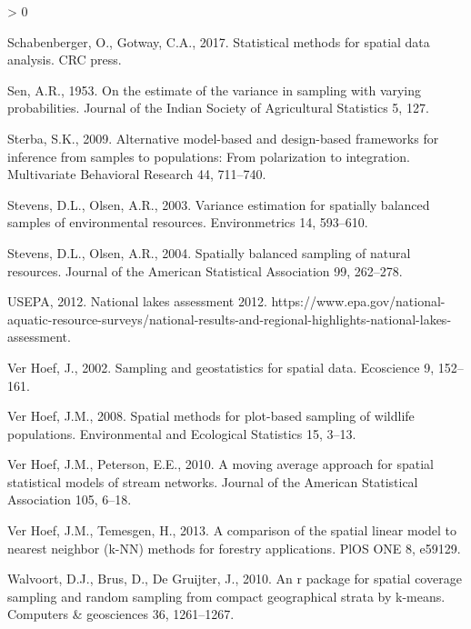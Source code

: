 \documentclass[]{elsarticle} %
\newlength{\cslhangindent}
\newenvironment{CSLReferences}[2] %
 {%
  \setlength{\parindent}{0pt}
  \ifodd #1 \everypar{\setlength{\hangindent}{\cslhangindent}}\ignorespaces\fi
  \ifnum #2 > 0
  \setlength{\parskip}{#2\baselineskip}
  \fi
 }%
 {}
\begin{document}
\begin{CSLReferences}{1}{0}
\leavevmode\hypertarget{ref-schabenberger2017statistical}{}%
Schabenberger, O., Gotway, C.A., 2017. Statistical methods for spatial
data analysis. CRC press.

\leavevmode\hypertarget{ref-sen1953estimate}{}%
Sen, A.R., 1953. On the estimate of the variance in sampling with
varying probabilities. Journal of the Indian Society of Agricultural
Statistics 5, 127.

\leavevmode\hypertarget{ref-sterba2009alternative}{}%
Sterba, S.K., 2009. Alternative model-based and design-based frameworks
for inference from samples to populations: From polarization to
integration. Multivariate Behavioral Research 44, 711--740.

\leavevmode\hypertarget{ref-stevens2003variance}{}%
Stevens, D.L., Olsen, A.R., 2003. Variance estimation for spatially
balanced samples of environmental resources. Environmetrics 14,
593--610.

\leavevmode\hypertarget{ref-stevens2004spatially}{}%
Stevens, D.L., Olsen, A.R., 2004. Spatially balanced sampling of natural
resources. Journal of the American Statistical Association 99, 262--278.

\leavevmode\hypertarget{ref-USEPA2012NLA}{}%
USEPA, 2012. National lakes assessment 2012.
https://www.epa.gov/national-aquatic-resource-surveys/national-results-and-regional-highlights-national-lakes-assessment.

\leavevmode\hypertarget{ref-verhoef2002sampling}{}%
Ver Hoef, J., 2002. Sampling and geostatistics for spatial data.
Ecoscience 9, 152--161.

\leavevmode\hypertarget{ref-verhoef2008spatial}{}%
Ver Hoef, J.M., 2008. Spatial methods for plot-based sampling of
wildlife populations. Environmental and Ecological Statistics 15, 3--13.

\leavevmode\hypertarget{ref-ver2010moving}{}%
Ver Hoef, J.M., Peterson, E.E., 2010. A moving average approach for
spatial statistical models of stream networks. Journal of the American
Statistical Association 105, 6--18.

\leavevmode\hypertarget{ref-ver2013comparison}{}%
Ver Hoef, J.M., Temesgen, H., 2013. A comparison of the spatial linear
model to nearest neighbor (k-NN) methods for forestry applications. PlOS
ONE 8, e59129.

\leavevmode\hypertarget{ref-walvoort2010r}{}%
Walvoort, D.J., Brus, D., De Gruijter, J., 2010. An r package for
spatial coverage sampling and random sampling from compact geographical
strata by k-means. Computers \& geosciences 36, 1261--1267.


\end{CSLReferences}
\end{document}
